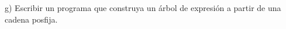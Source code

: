 {\color[rgb]{1,0,0}
g) Escribir un programa que construya un árbol de
expresión a partir de una cadena posfija.
}